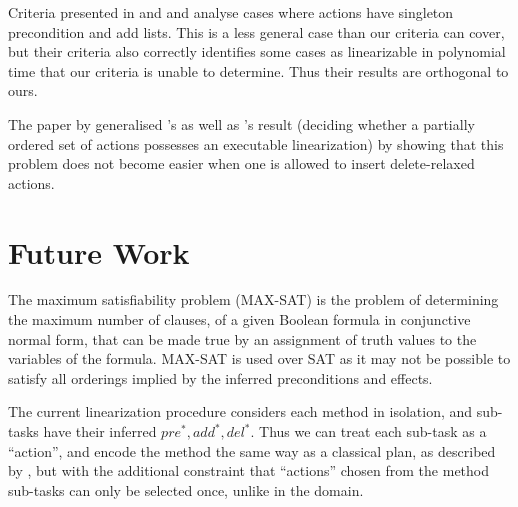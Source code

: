 \documentclass[letterpaper]{article} %
\newcommand{\PreS} {\ensuremath{\mathit{pre^{*}}}}
\newcommand{\AddS} {\ensuremath{\mathit{add^{*}}}}
\newcommand{\DelS} {\ensuremath{\mathit{del^{*}}}}
\begin{document}
Criteria presented in \cite{NEBEL1994125} and \cite{KambhampatiModalTruth1996} and  \cite{TanGruningerPOPlanComplexity} analyse cases where actions have singleton precondition and add lists. This is a less general case than our criteria can cover, but their criteria also correctly identifies some cases as linearizable in polynomial time that our criteria is unable to determine. Thus their results are orthogonal to ours. 

The paper by \citet{DeleteRelaxation, Bercher2021POCLComplexities} generalised \cite{NEBEL1994125}'s as well as \cite{ErolHTNExpressivity}'s result (deciding whether a partially ordered
set of actions possesses an executable linearization) by showing that this problem does not become easier when one is allowed to insert delete-relaxed  actions.

\section{Future Work}
The maximum satisfiability problem (MAX-SAT) is the problem of determining the maximum number of clauses, of a given Boolean formula in conjunctive normal form, that can be made true by an assignment of truth values to the variables of the formula. MAX-SAT is used over SAT as it may not be possible to satisfy all orderings implied by the inferred preconditions and effects.

The current linearization procedure considers each method in isolation, and sub-tasks have their inferred $\PreS, \AddS, \DelS$. Thus we can treat each sub-task as a \enquote{action}, and encode the method the same way as a classical plan, as described by \cite{RINTANEN201245}, but with the additional constraint that \enquote{actions} chosen from the method sub-tasks can only be selected once, unlike in the domain.


\end{document}
